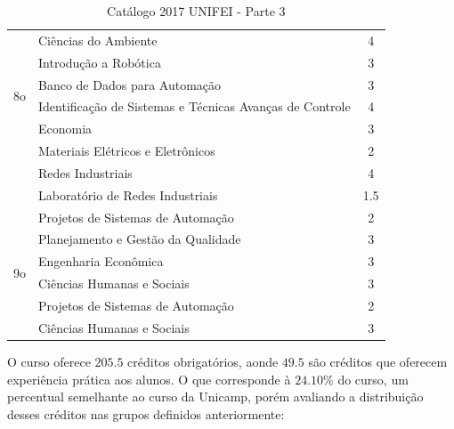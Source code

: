 \documentclass[12pt]{article} %
\begin{document}
\begin{table}[H]
\begin{tabular}{|c|l|c|}
\multirow{6}{*}{8o}  
				   & Ciências do Ambiente                          		& 4        \\ \cline{2-3} 
                     & Introdução a Robótica                          & 3        \\ \cline{2-3} 
                     & Banco de Dados para Automação                                & 3        \\ \cline{2-3} 
                     & Identificação de Sistemas e Técnicas Avanças de Controle                          & 4        \\ \cline{2-3} 
                     & Economia                          & 3        \\ \cline{2-3} 
                     & Materiais Elétricos e Eletrônicos                         & 2        \\ \cline{2-3}  
                     & Redes Industriais                                & 4        \\ \cline{2-3} 
                     & Laboratório de Redes Industriais                            & 1.5        \\ \hline  
\multirow{6}{*}{9o}  
				   & Projetos de Sistemas de Automação                          		& 2        \\ \cline{2-3} 
                     & Planejamento e Gestão da Qualidade                          & 3        \\ \cline{2-3} 
                     & Engenharia Econômica                               & 3        \\ \cline{2-3} 
                     & Ciências Humanas e Sociais                          & 3        \\ \hline
\multirow{6}{*}{10o}  
				   & Projetos de Sistemas de Automação                          		& 2        \\ \cline{2-3} 
                     & Ciências Humanas e Sociais                          & 3        \\ \hline

\end{tabular}
\caption{Catálogo 2017 UNIFEI -  Parte 3}
\label{catalago1}
\end{table}

O curso oferece $205.5$ créditos obrigatórios, aonde $49.5$ são créditos que oferecem experiência prática aos alunos. O que corresponde à $24.10\%$ do curso, um percentual semelhante ao curso da Unicamp, porém avaliando a distribuição desses créditos nas grupos definidos anteriormente:
\end{document}
